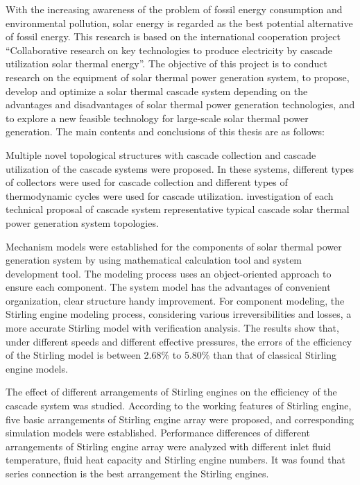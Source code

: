 \enabstract
{
\begin{spacing}{1.4}
With the increasing awareness of the problem of fossil energy consumption and environmental pollution, solar energy is regarded as the best potential alternative of fossil energy. This research is based on the international cooperation project ``Collaborative research on key technologies to produce electricity by cascade utilization solar thermal energy''. The objective of this project is to conduct research on the equipment of solar thermal power generation system, to propose, develop and optimize a solar thermal cascade system depending on the advantages and disadvantages of solar thermal power generation technologies, and to explore a new feasible technology for large-scale solar thermal power generation. The main contents and conclusions of this thesis are as follows:

Multiple novel topological structures with cascade collection and cascade utilization of the cascade systems were proposed. In these systems, different types of collectors were used for cascade collection and different types of thermodynamic cycles were used for cascade utilization.  investigation of each technical proposal of cascade system representative typical cascade solar thermal power generation system topologies.

Mechanism models were established for the components of solar thermal power generation system by using mathematical calculation tool and system development tool. The modeling process uses an object-oriented approach to ensure  each component. The system model has the advantages of convenient organization, clear structure handy improvement. For component modeling, the Stirling engine modeling process, considering various irreversibilities and losses,  a more accurate Stirling model with verification analysis. The results show that, under different speeds and different effective pressures, the errors of the efficiency of the  Stirling model is between 2.68\% to 5.80\%  than that of classical Stirling engine models.

The effect of different arrangements of Stirling engines on the efficiency of the cascade system was studied. 
According to the working features of Stirling engine, five basic arrangements of Stirling engine array were proposed, and corresponding simulation models were established.
Performance differences of different arrangements of Stirling engine array were analyzed with different inlet fluid temperature, fluid heat capacity and Stirling engine numbers.
It was found that series connection is the best arrangement  the Stirling engines.


\end{spacing}}

